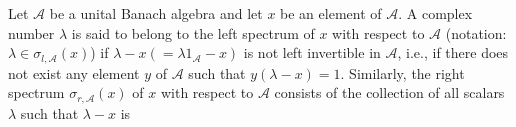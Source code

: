 Let $\mathcal{A}$ be a unital Banach algebra and let $x$ be an element of $\mathcal{A}$. A complex number $\lambda$ is said to belong to the left spectrum of $x$ with respect to $\mathcal{A}$ (notation: $\lambda \in \sigma_{l, \mathcal{A}}(x)$) if $\lambda - x(= \lambda 1_{\mathcal{A}} - x)$ is not left invertible in $\mathcal{A}$, i.e., if there does not exist any element $y$ of $\mathcal{A}$ such that $y(\lambda - x) = 1$. Similarly, the right spectrum $\sigma_{r, \mathcal{A}}(x)$ of $x$ with respect to $\mathcal{A}$ consists of the collection of all scalars $\lambda$ such that $\lambda - x$ is
